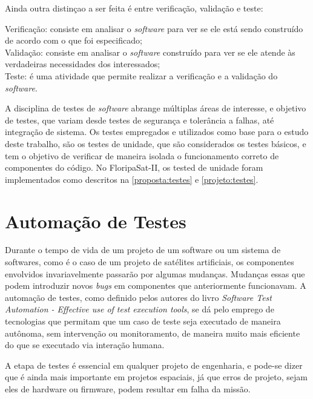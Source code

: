 Ainda outra distinçao a ser feita é entre verificação, validação e teste:

\begin{citacao}
\hspace{1,2cm} Verificação: consiste em analisar o \textit{software} para ver se ele está sendo construído de acordo com o que foi especificado;\\
\hspace{1,2cm} Validação: consiste em analisar o \textit{software} construído para ver se ele atende às verdadeiras necessidades dos interessados; \\
\hspace{1,2cm} Teste: é uma atividade que permite realizar a verificação e a validação do \textit{software}. \\
\cite{engenharia-software}
\end{citacao}

A disciplina de testes de \textit{software} abrange múltiplas áreas de interesse, e objetivo de testes, que variam desde testes de segurança e tolerância a falhas, até integração de sistema. Os testes empregados e utilizados como base para o estudo deste trabalho, são os testes de unidade, que são considerados os testes básicos, e tem o objetivo de verificar de maneira isolada o funcionamento correto de componentes do código. No FloripaSat-II, os tested de unidade foram implementados como descritos na \autoref{proposta:testes} e \autoref{projeto:testes}.

\section{Automação de Testes}
\label{fundamentacao:test-automation}

Durante o tempo de vida de um projeto de um software ou um sistema de softwares, como é o caso de um projeto de satélites artificiais,
os componentes envolvidos invariavelmente passarão por algumas mudanças. Mudanças essas que podem introduzir novos \textit{bugs} em
componentes que anteriormente funcionavam. A automação de testes, como definido pelos autores do livro
\textit{Software Test Automation - Effective use of test execution tools}, se dá pelo emprego de tecnologias que permitam que um caso
de teste seja executado de maneira autônoma, sem intervenção ou monitoramento, de maneira muito mais eficiente\cite{software-automation}
do que se executado via interação humana.

A etapa de testes é essencial em qualquer projeto de engenharia, e pode-se dizer que é ainda mais importante em projetos espaciais, já
que erros de projeto, sejam eles de hardware ou firmware, podem resultar em falha da missão.

